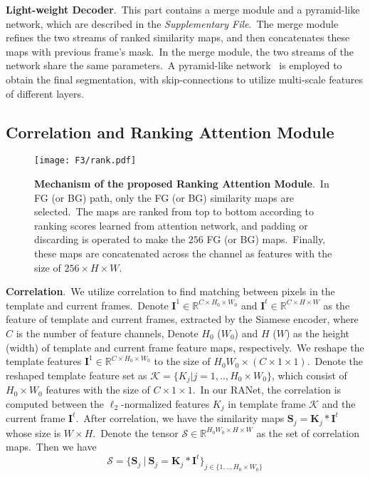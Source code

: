 \documentclass[10pt,twocolumn,letterpaper]{article}
\begin{document}
\noindent
\textbf{Light-weight Decoder}.\
This part contains a merge module and a pyramid-like network, which are described in the \textit{Supplementary File}.\ The merge module refines the two streams of ranked similarity maps, and then concatenates these maps with previous frame's mask.\ In the merge module, the two streams of the network share the same parameters.\ A pyramid-like network~\cite{u-net,refinenet,accv} is employed to obtain the final segmentation, with skip-connections to utilize multi-scale features of different layers.\ 




\subsection{Correlation and Ranking Attention Module}
\label{sec:ccsim}


\begin{figure}
\vspace{-5mm}
\begin{center}
\texttt{[image: F3/rank.pdf]}
\end{center}
\vspace{-7mm}
\caption{\textbf{Mechanism of the proposed Ranking Attention Module}.\ In FG (or BG) path, only the FG (or BG) similarity maps are selected.\ The maps are ranked from top to bottom according to ranking scores learned from attention network, and padding or discarding is operated to make the $256$ FG (or BG) maps.\ Finally, these maps are concatenated across the channel as features with the size of $256 \times H \times W$.}
\label{fig:rank}
\vspace{-4mm}
\end{figure}


\noindent
\textbf{Correlation}.\ We utilize correlation to find matching between pixels in the template and current frames.\ Denote $\bm{I}^{1}\in\mathbb{R}^{C\times H_0\times W_0}$ and $\bm{I}^{t}\in\mathbb{R}^{C\times H\times W}$ as the feature of template and current frames, extracted by the Siamese encoder, where $C$ is the number of feature channels, Denote $H_0$ ($W_0$) and $H$ ($W$) as the height (width) of template and current frame feature maps, respectively.\ 
We reshape the template features $\bm{I}^{1}\in\mathbb{R}^{C\times H_0\times W_0}$ to the size of $H_0W_0 \times (C \times 1 \times 1)$.\ Denote the reshaped template feature set as $\mathcal{K}=\{K_j|j=1,..,H_0\times W_0\}$, which consist of $H_0\times W_0$ features with the size of $C \times 1 \times 1$.\ 
In our RANet, the correlation is computed between the $\ell_2$-normalized features $K_j$ in template frame $\mathcal{K}$ and the current frame $\bm{I}^{t}$.\ After correlation, we have the similarity maps $\bm{S}_j = \bm{K}_j \ast \bm{I}^t$ whose size is $W\times H$.\
Denote the tensor $\mathcal{S}\in\mathbb{R}^{H_0W_0\times H\times W}$ as the set of correlation maps.\ Then we have
\begin{equation}
\mathcal{S} = \{\bm{S}_j\ |\  \bm{S}_j = \bm{K}_j \ast \bm{I}^t\}_{
j\in\{1,..,H_0\times W_0\}}
\label{eq:correlation}
\end{equation}
\end{document}
